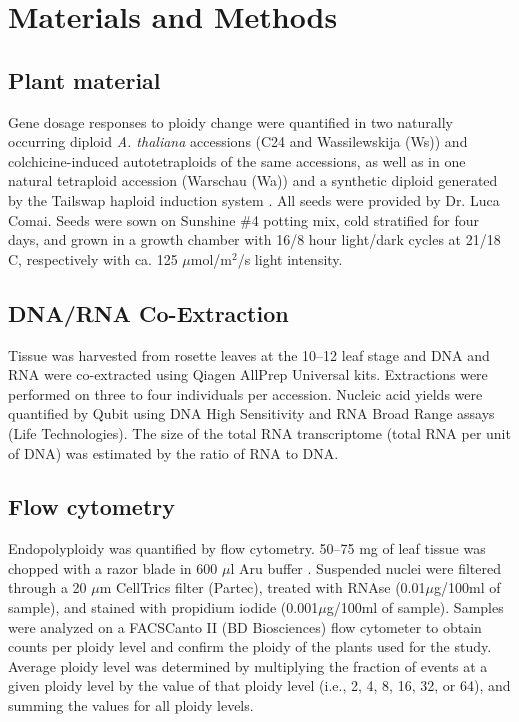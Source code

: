 \documentclass[11pt]{article}
\begin{document}
\section*{Materials and Methods}
\subsection*{Plant material}
Gene dosage responses to ploidy change were quantified in two naturally occurring diploid \textit{A. thaliana} accessions (C24 and Wassilewskija (Ws)) and colchicine-induced autotetraploids of the same accessions, as well as in one natural tetraploid accession (Warschau (Wa)) and a synthetic diploid generated by the Tailswap haploid induction system \citep{ravi2010}.
All seeds were provided by Dr. Luca Comai.
Seeds were sown on Sunshine \#4 potting mix, cold stratified for four days, and grown in a growth chamber with 16/8 hour light/dark cycles at 21/18 C, respectively with ca. 125 $\mu$mol/m$^2$/s light intensity.\\

\subsection*{DNA/RNA Co-Extraction}
Tissue was harvested from rosette leaves at the 10--12 leaf stage and DNA and RNA were co-extracted using Qiagen AllPrep Universal kits.
Extractions were performed on three to four individuals per accession.
Nucleic acid yields were quantified by Qubit using DNA High Sensitivity and RNA Broad Range assays (Life Technologies).
The size of the total RNA transcriptome (total RNA per unit of DNA) was estimated by the ratio of RNA to DNA.\\

\subsection*{Flow cytometry}
Endopolyploidy was quantified by flow cytometry.
50--75 mg of leaf tissue was chopped with a razor blade in 600 $\mu$l Aru buffer \citep{arumuganathan1991}.
Suspended nuclei were filtered through a 20 $\mu$m CellTrics filter (Partec), treated with RNAse (0.01$\mu$g/100ml of sample), and stained with propidium iodide (0.001$\mu$g/100ml of sample).
Samples were analyzed on a FACSCanto II (BD Biosciences) flow cytometer to obtain counts per ploidy level and confirm the ploidy of the plants used for the study.
Average ploidy level was determined by multiplying the fraction of events at a given ploidy level by the value of that ploidy level (i.e., 2, 4, 8, 16, 32, or 64), and summing the values for all ploidy levels.\\
\end{document}
